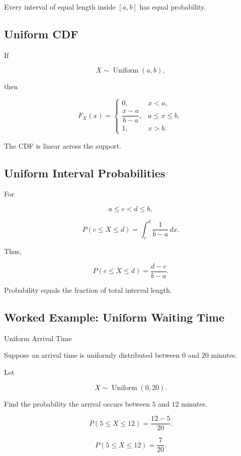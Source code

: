 Every interval of equal length inside \([a,b]\) has equal probability.

\subsection{Uniform CDF}
\label{subsec:uniform-cdf}

If

\[
X\sim\operatorname{Uniform}(a,b),
\]

then

\[
\boxed{
F_X(x)
=
\begin{cases}
0,&x<a,\\[1mm]
\dfrac{x-a}{b-a},&a\leq x\leq b,\\[3mm]
1,&x>b.
\end{cases}
}
\]

The CDF is linear across the support.

\subsection{Uniform Interval Probabilities}
\label{subsec:uniform-interval-probabilities}

For

\[
a\leq c<d\leq b,
\]

\[
P(c\leq X\leq d)
=
\int_c^d
\frac1{b-a}\,dx.
\]

Thus,

\[
\boxed{
P(c\leq X\leq d)
=
\frac{d-c}{b-a}.
}
\]

Probability equals the fraction of total interval length.

\subsection{Worked Example: Uniform Waiting Time}
\label{subsec:worked-uniform-waiting}

\begin{workedexamplebox}{Uniform Arrival Time}

Suppose an arrival time is uniformly distributed between \(0\) and
\(20\) minutes.

Let

\[
X\sim\operatorname{Uniform}(0,20).
\]

Find the probability the arrival occurs between \(5\) and \(12\)
minutes.

\[
P(5\leq X\leq12)
=
\frac{12-5}{20}.
\]

\begin{answerbox}
\[
\boxed{
P(5\leq X\leq12)
=
\frac7{20}.
}
\]
\end{answerbox}

\end{workedexamplebox}

